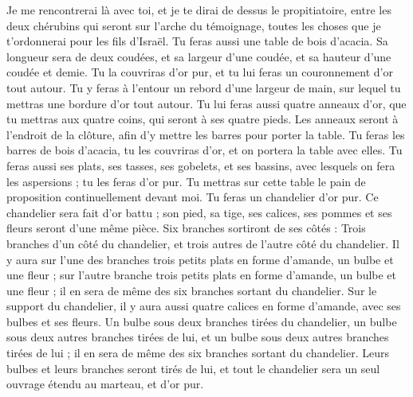 \begin{multicols}{2}
Je me rencontrerai là avec toi, et je te dirai de dessus le propitiatoire, entre les deux chérubins qui seront sur l'arche du témoignage, toutes les choses que je t’ordonnerai pour les fils d'Israël.
Tu feras aussi une table de bois d’acacia. Sa longueur sera de deux coudées, et sa largeur d'une coudée, et sa hauteur d'une coudée et demie.
Tu la couvriras d’or pur, et tu lui feras un couronnement d'or tout autour.
Tu y feras à l’entour un rebord d’une largeur de main, sur lequel tu mettras une bordure d’or tout autour.
Tu lui feras aussi quatre anneaux d'or, que tu mettras aux quatre coins, qui seront à ses quatre pieds.
Les anneaux seront à l'endroit de la clôture, afin d'y mettre les barres pour porter la table.
Tu feras les barres de bois d’acacia, tu les couvriras d'or, et on portera la table avec elles.
Tu feras aussi ses plats, ses tasses, ses gobelets, et ses bassins, avec lesquels on fera les aspersions ; tu les feras d’or pur.
Tu mettras sur cette table le pain de proposition continuellement devant moi.
Tu feras un chandelier d’or pur. Ce chandelier sera fait d’or battu ; son pied, sa tige, ses calices, ses pommes et ses fleurs seront d’une même pièce.
Six branches sortiront de ses côtés : Trois branches d'un côté du chandelier, et trois autres de l'autre côté du chandelier.
Il y aura sur l’une des branches trois petits plats en forme d'amande, un bulbe et une fleur ; sur l'autre branche trois petits plats en forme d'amande, un bulbe et une fleur ; il en sera de même des six branches sortant du chandelier.
Sur le support du chandelier, il y aura aussi quatre calices en forme d'amande, avec ses bulbes et ses fleurs.
Un bulbe sous deux branches tirées du chandelier, un bulbe sous deux autres branches tirées de lui, et un bulbe sous deux autres branches tirées de lui ; il en sera de même des six branches sortant du chandelier.
Leurs bulbes et leurs branches seront tirés de lui, et tout le chandelier sera un seul ouvrage étendu au marteau, et d’or pur.

\end{multicols}
